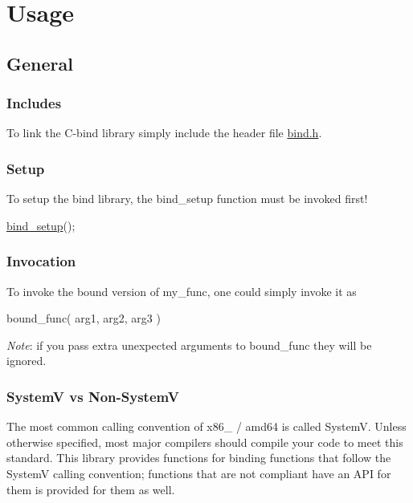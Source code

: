 \section*{Usage}

\subsection*{General}

\subsubsection*{Includes}

To link the {\ttfamily C-\/bind} library simply include the header file {\ttfamily \hyperlink{bind_8h}{bind.\+h}}.

\subsubsection*{Setup}

To setup the bind library, the {\ttfamily bind\+\_\+setup} function must be invoked first! 
\begin{DoxyCode}
\hyperlink{bind_8c_a57d49e18c9326489d842187e2a1e0086}{bind\_setup}();
\end{DoxyCode}


\subsubsection*{Invocation}

To invoke the bound version of {\ttfamily my\+\_\+func}, one could simply invoke it as 
\begin{DoxyCode}
bound\_func( arg1, arg2, arg3 )
\end{DoxyCode}
 {\itshape Note}\+: if you pass extra unexpected arguments to {\ttfamily bound\+\_\+func} they will be ignored.

\subsubsection*{SystemV vs Non-\/\+SystemV}

The most common calling convention of {\ttfamily x86\+\_} / {\ttfamily amd64} is called SystemV. Unless otherwise specified, most major compilers should compile your code to meet this standard. This library provides functions for binding functions that follow the SystemV calling convention; functions that are not compliant have an A\+PI for them is provided for them as well.

